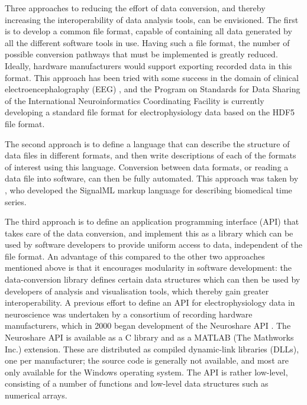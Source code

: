 \documentclass{frontiers}
\begin{document}
Three approaches to reducing the effort of data conversion, and thereby increasing the interoperability of data analysis tools, can be envisioned.
The first is to develop a common file format, capable of containing all data generated by all the different software tools in use.
Having such a file format, the number of possible conversion pathways that must be implemented is greatly reduced.
Ideally, hardware manufacturers would support exporting recorded data in this format.
This approach has been tried with some success in the domain of clinical electroencephalography (EEG) \citep[The European Data Format, EDF;][]{Kemp1992, Kemp2003}, and the Program on Standards for Data Sharing of the International Neuroinformatics Coordinating Facility is currently developing a standard file format for electrophysiology data \citep{Teeters2013} based on the HDF5 file format.

The second approach is to define a language that can describe the structure of data files in different formats, and then write descriptions of each of the formats of interest using this language.
Conversion between data formats, or reading a data file into software, can then be fully automated.
This approach was taken by \citet{Durka2004}, who developed the SignalML markup language for describing biomedical time series.

The third approach is to define an application programming interface (API) that takes care of the data conversion, and implement this as a library which can be used by software developers to provide uniform access to data, independent of the file format.
An advantage of this compared to the other two approaches mentioned above is that it encourages modularity in software development: the data-conversion library defines certain data structures which can then be used by developers of analysis and visualisation tools, which thereby gain greater interoperability.
A previous effort to define an API for electrophysiology data in neuroscience was undertaken by a consortium of recording hardware manufacturers, which in 2000 began development of the Neuroshare API \citep{neuroshare}.
The Neuroshare API is available as a C library and as a MATLAB (The Mathworks Inc.) extension.
These are distributed as compiled dynamic-link libraries (DLLs), one per manufacturer; the source code is generally not available, and most are only available for the Windows operating system.
The API is rather low-level, consisting of a number of functions and low-level data structures such as numerical arrays.
\end{document}
